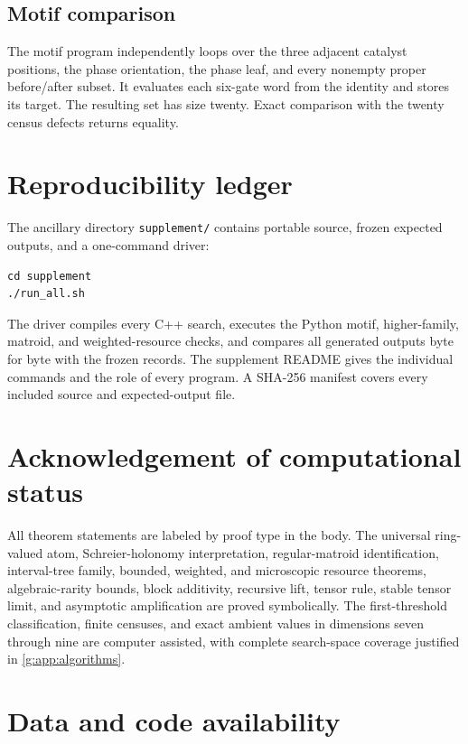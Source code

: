 \subsection{Motif comparison}

The motif program independently loops over the three adjacent catalyst positions, the phase orientation, the phase leaf, and every nonempty proper before/after subset.  It evaluates each six-gate word from the identity and stores its target.  The resulting set has size twenty.  Exact comparison with the twenty census defects returns equality.

\section{Reproducibility ledger}\label{g:app:reproducibility}

The ancillary directory \texttt{supplement/} contains portable source, frozen expected outputs, and a one-command driver:
\begin{verbatim}
cd supplement
./run_all.sh
\end{verbatim}
The driver compiles every C++ search, executes the Python motif, higher-family, matroid, and weighted-resource checks, and compares all generated outputs byte for byte with the frozen records.  The supplement README gives the individual commands and the role of every program.  A SHA-256 manifest covers every included source and expected-output file.

\section*{Acknowledgement of computational status}

All theorem statements are labeled by proof type in the body.  The universal ring-valued atom, Schreier-holonomy interpretation, regular-matroid identification, interval-tree family, bounded, weighted, and microscopic resource theorems, algebraic-rarity bounds, block additivity, recursive lift, tensor rule, stable tensor limit, and asymptotic amplification are proved symbolically.  The first-threshold classification, finite censuses, and exact ambient values in dimensions seven through nine are computer assisted, with complete search-space coverage justified in \cref{g:app:algorithms}.

\section*{Data and code availability}

